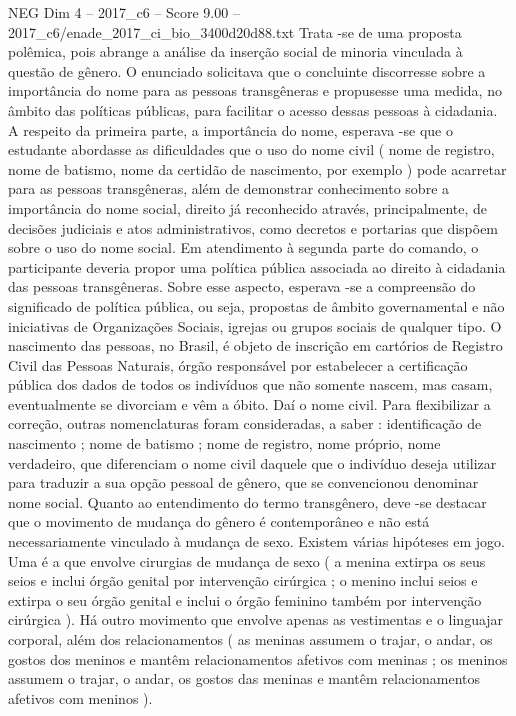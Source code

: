 \begin{textsample}{NEG Dim 4 – 2017\_c6 – Score 9.00 – 2017\_c6/enade\_2017\_ci\_bio\_3400d20d88.txt}
Trata -se de uma proposta polêmica, pois abrange a análise da inserção social de minoria vinculada à questão de gênero.
O enunciado solicitava que o concluinte discorresse sobre a importância do nome para as pessoas transgêneras e propusesse uma medida, no âmbito das políticas públicas, para facilitar o acesso dessas pessoas à cidadania.
A respeito da primeira parte, a importância do nome, esperava -se que o estudante abordasse as dificuldades que o uso do nome civil ( nome de registro, nome de batismo, nome da certidão de nascimento, por exemplo ) pode acarretar para as pessoas transgêneras, além de demonstrar conhecimento sobre a importância do nome social, direito já reconhecido através, principalmente, de decisões judiciais e atos administrativos, como decretos e portarias que dispõem sobre o uso do nome social.
Em atendimento à segunda parte do comando, o participante deveria propor uma política pública associada ao direito à cidadania das pessoas transgêneras.
Sobre esse aspecto, esperava -se a compreensão do significado de política pública, ou seja, propostas de âmbito governamental e não iniciativas de Organizações Sociais, igrejas ou grupos sociais de qualquer tipo.
O nascimento das pessoas, no Brasil, é objeto de inscrição em cartórios de Registro Civil das Pessoas Naturais, órgão responsável por estabelecer a certificação pública dos dados de todos os indivíduos que não somente nascem, mas casam, eventualmente se divorciam e vêm a óbito.
Daí o nome civil.
Para flexibilizar a correção, outras nomenclaturas foram consideradas, a saber : identificação de nascimento ; nome de batismo ; nome de registro, nome próprio, nome verdadeiro, que diferenciam o nome civil daquele que o indivíduo deseja utilizar para traduzir a sua opção pessoal de gênero, que se convencionou denominar nome social.
Quanto ao entendimento do termo transgênero, deve -se destacar que o movimento de mudança do gênero é contemporâneo e não está necessariamente vinculado à mudança de sexo.
Existem várias hipóteses em jogo.
Uma é a que envolve cirurgias de mudança de sexo ( a menina extirpa os seus seios e inclui órgão genital por intervenção cirúrgica ; o menino inclui seios e extirpa o seu órgão genital e inclui o órgão feminino também por intervenção cirúrgica ).
Há outro movimento que envolve apenas as vestimentas e o linguajar corporal, além dos relacionamentos ( as meninas assumem o trajar, o andar, os gostos dos meninos e mantêm relacionamentos afetivos com meninas ; os meninos assumem o trajar, o andar, os gostos das meninas e mantêm relacionamentos afetivos com meninos ).

\end{textsample}
